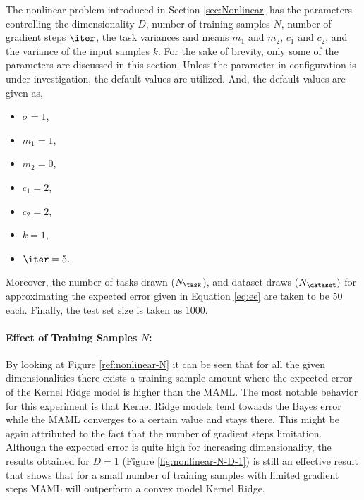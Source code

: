 The nonlinear problem introduced in Section \ref{sec:Nonlinear} has the parameters controlling the dimensionality $D$, number of training samples $N$, number of gradient steps $\iter$, the task variances and means $m_1$ and $m_2$, $c_1$ and $c_2$, and the variance of the input samples $k$. For the sake of brevity, only some of the parameters are discussed in this section. Unless the parameter in configuration is under investigation, the default values are utilized. And, the default values are given as,
\begin{itemize}
  \item $\sigma=1$,
  \item $m_1=1$,
  \item $m_2=0$,
  \item $c_1=2$,
  \item $c_2=2$,
  \item $k=1$,
  \item $\iter=5$.
\end{itemize}
Moreover, the number of tasks drawn ($N_{\task}$), and dataset draws ($N_{\dataset})$  for approximating the expected error given in Equation \ref{eq:ee} are taken to be $50$ each. Finally, the test set size is taken as 1000.

\paragraph{Effect of Training Samples $N$:} By looking at Figure \ref{ref:nonlinear-N} it can be seen that for all the given dimensionalities there exists a training sample amount where the expected error of the Kernel Ridge model is higher than the MAML. The most notable behavior for this experiment is that Kernel Ridge models tend towards the Bayes error while the MAML converges to a certain value and stays there. This might be again attributed to the fact that the number of gradient steps limitation. Although the expected error is quite high for increasing dimensionality, the results obtained for $D=1$ (Figure \ref{fig:nonlinear-N-D-1}) is still an effective result that shows that for a small number of training samples with limited gradient steps MAML will outperform a convex model Kernel Ridge.

